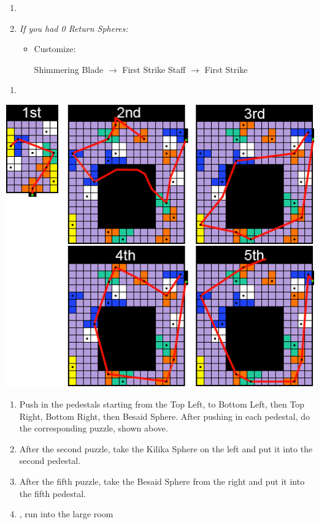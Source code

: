 \begin{spheregrid}
\begin{itemize}
\begin{itemize}
        \end{itemize}
    \end{itemize}
\end{spheregrid}
\bothcb \wincb \losscb
\begin{enumerate}[resume]
    \item \formation{\tidus}{\auron}{\yuna}
    \item \textit{If you had 0 Return Spheres:}
    \begin{itemize}
        \item Customize:
        \begin{itemize}
            \auronf Shimmering Blade $\rightarrow$ First Strike
            \yunaf Staff $\rightarrow$ First Strike
        \end{itemize}
    \end{itemize}
\end{enumerate}
\begin{enumerate}[resume]
    \item {\large \save}
\end{enumerate}
\includegraphics[width=.95\columnwidth]{graphics/Zanarkand_Trials}
\begin{enumerate}[resume]
    \item Push in the pedestals starting from the Top Left, to Bottom Left, then Top Right, Bottom Right, then Besaid Sphere. After pushing in each pedestal, do the corresponding puzzle, shown above.
    \item After the second puzzle, take the Kilika Sphere on the left and put it into the second pedestal.
    \item After the fifth puzzle, take the Besaid Sphere from the right and put it into the fifth pedestal.
    \item \cs, run into the large room
\end{enumerate}
